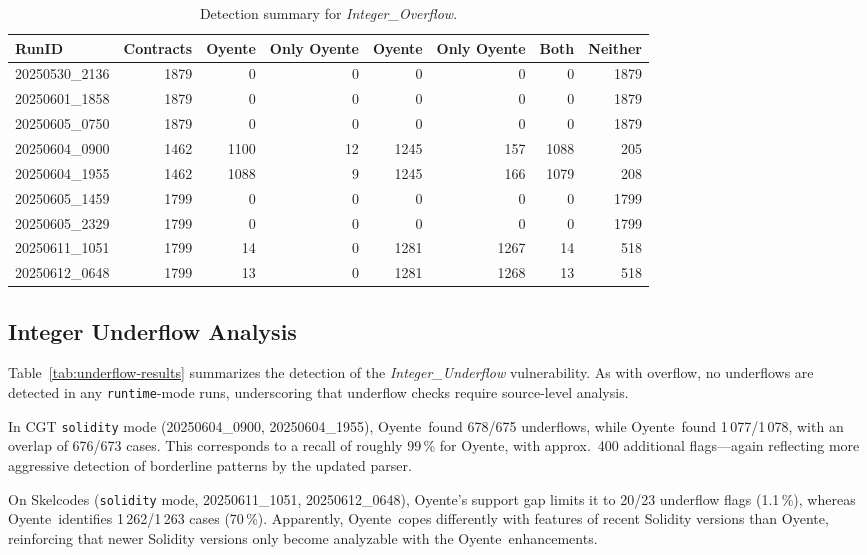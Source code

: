 \documentclass{article}
\newcommand\OY{Oyente}
\newcommand\OYp{\OY\raisebox{0.3ex}{\smaller +}}
\newcommand\CGTrbcA{20250530\_2136}%
\newcommand\CGTrbcB{20250601\_1858}%
\newcommand\CGTrbcC{20250605\_0750}%
\newcommand\CGTsscA{20250604\_0900}%
\newcommand\CGTsscB{20250604\_1955}%
\newcommand\SKCrbcA{20250605\_1459}%
\newcommand\SKCrbcB{20250605\_2329}%
\newcommand\SKCsscA{20250611\_1051}%
\newcommand\SKCsscB{20250612\_0648}%
\begin{document}
	\begin{table}[ht]
		\centering
		\begin{tabular}{lrrrrrrr}
			\toprule
			\textbf{RunID} & \textbf{Contracts} & \textbf{\OY} & \textbf{Only \OY} & \textbf{\OYp} & \textbf{Only \OYp} & \textbf{Both} & \textbf{Neither} \\
			\midrule
			\CGTrbcA & 1879 & 0 & 0 & 0 & 0 & 0 & 1879 \\
			\CGTrbcB & 1879 & 0 & 0 & 0 & 0 & 0 & 1879 \\
			\CGTrbcC & 1879 & 0 & 0 & 0 & 0 & 0 & 1879 \\
			\CGTsscA & 1462 & 1100 & 12 & 1245 & 157 & 1088 & 205 \\
			\CGTsscB & 1462 & 1088 & 9 & 1245 & 166 & 1079 & 208 \\
			\SKCrbcA & 1799 & 0 & 0 & 0 & 0 & 0 & 1799 \\
			\SKCrbcB & 1799 & 0 & 0 & 0 & 0 & 0 & 1799 \\
			\SKCsscA & 1799 & 14 & 0 & 1281 & 1267 & 14 & 518  \\
			\SKCsscB & 1799 & 13 & 0 & 1281 & 1268 & 13 & 518  \\
			\bottomrule
		\end{tabular}
		\caption{Detection summary for \emph{Integer\_Overflow}.}
		\label{tab:overflow-results}
	\end{table}

	\subsection{Integer Underflow Analysis}
	Table~\ref{tab:underflow-results} summarizes the detection of the \emph{Integer\_Underflow} vulnerability. As with overflow, no underflows are detected in any \texttt{runtime}-mode runs, underscoring that underflow checks require source-level analysis.

	In CGT \texttt{solidity} mode (\CGTsscA, \CGTsscB), \OY\ found 678/675 underflows, while \OYp\ found 1\,077/1\,078, with an overlap of 676/673 cases. This corresponds to a recall of roughly 99\,\% for \OYp, with approx.~400 additional flags—again reflecting more aggressive detection of borderline patterns by the updated parser.

	On Skelcodes (\texttt{solidity} mode, \SKCsscA, \SKCsscB), \OY’s support gap limits it to 20/23 underflow flags (1.1\,\%), whereas \OYp\ identifies 1\,262/1\,263 cases (70\,\%). Apparently, \OYp\ copes differently with features of recent Solidity versions than \OY, reinforcing that newer Solidity versions only become analyzable with the \OYp\ enhancements.
\end{document}

